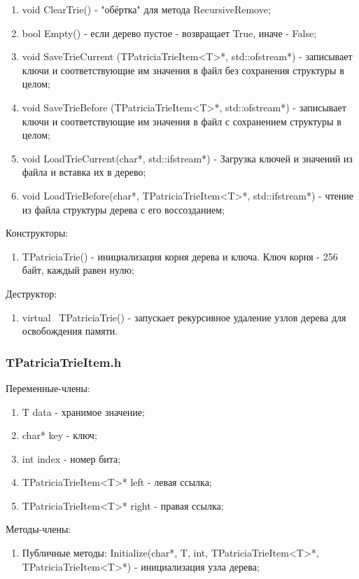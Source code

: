 \documentclass[12pt]{article}
\begin{document}
\begin{enumerate}
\begin{enumerate}
		\item void ClearTrie() - "обёртка" для метода RecursiveRemove;
		\item bool Empty() - если дерево пустое - возвращает True, иначе - False;
		\item void SaveTrieCurrent (TPatriciaTrieItem<T>*, std::ofstream*) - записывает ключи и соответствующие им значения в файл без сохранения структуры в целом;
		\item void SaveTrieBefore (TPatriciaTrieItem<T>*, std::ofstream*) - записывает ключи и соответствующие им значения в файл с сохранением структуры в целом;
		\item void LoadTrieCurrent(char*, std::ifstream*) - Загрузка ключей и значений из файла и вставка их в дерево;
		\item void LoadTrieBefore(char*, TPatriciaTrieItem<T>*, std::ifstream*) - чтение из файла структуры дерева с его воссозданием;
	\end{enumerate}
\end{enumerate}


Конструкторы:
\begin{enumerate}
	\item TPatriciaTrie() - инициализация корня дерева и ключа. Ключ корня - 256 байт, каждый равен нулю;
\end{enumerate}

Деструктор:
\begin{enumerate}
	\item virtual ~TPatriciaTrie() - запускает рекурсивное удаление узлов дерева для освобождения памяти.
\end{enumerate}

\subsubsection*{TPatriciaTrieItem.h}

Переменные-члены:
\begin{enumerate}
	\item T data - хранимое значение;
	\item char* key - ключ;
	\item int index - номер бита;
	\item TPatriciaTrieItem<T>* left - левая ссылка;
	\item TPatriciaTrieItem<T>* right - правая ссылка;
\end{enumerate}

Методы-члены:
\begin{enumerate}
	\item Публичные методы:
		\subitem Initialize(char*, T, int, TPatriciaTrieItem<T>*, TPatriciaTrieItem<T>*) - инициализация узла дерева;
\end{enumerate}
\end{document}
